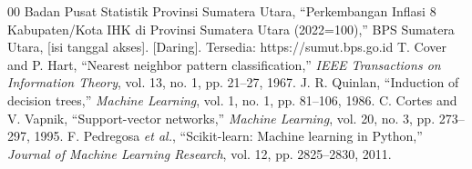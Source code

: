 \documentclass[conference]{IEEEtran}
\begin{document}
\begin{thebibliography}{00}
 Badan Pusat Statistik Provinsi Sumatera Utara, ``Perkembangan Inflasi 8 Kabupaten/Kota IHK di Provinsi Sumatera Utara (2022=100),'' BPS Sumatera Utara, [isi tanggal akses]. [Daring]. Tersedia: https://sumut.bps.go.id
 T. Cover and P. Hart, ``Nearest neighbor pattern classification,'' \emph{IEEE Transactions on Information Theory}, vol. 13, no. 1, pp. 21--27, 1967.
 J. R. Quinlan, ``Induction of decision trees,'' \emph{Machine Learning}, vol. 1, no. 1, pp. 81--106, 1986.
 C. Cortes and V. Vapnik, ``Support-vector networks,'' \emph{Machine Learning}, vol. 20, no. 3, pp. 273--297, 1995.
 F. Pedregosa \emph{et al.}, ``Scikit-learn: Machine learning in Python,'' \emph{Journal of Machine Learning Research}, vol. 12, pp. 2825--2830, 2011.
\end{thebibliography}
\end{document}
